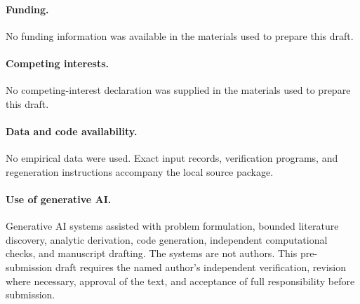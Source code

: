 \documentclass[11pt]{article}
\begin{document}
\paragraph{Funding.} No funding information was available in the materials used to
prepare this draft.

\paragraph{Competing interests.} No competing-interest declaration was supplied in
the materials used to prepare this draft.

\paragraph{Data and code availability.} No empirical data were used. Exact input
records, verification programs, and regeneration instructions accompany the local
source package.

\paragraph{Use of generative AI.} Generative AI systems assisted with problem
formulation, bounded literature discovery, analytic derivation, code generation,
independent computational checks, and manuscript drafting. The systems are not authors.
This pre-submission draft requires the named author's independent verification,
revision where necessary, approval of the text, and acceptance of full responsibility
before submission.



\end{document}
